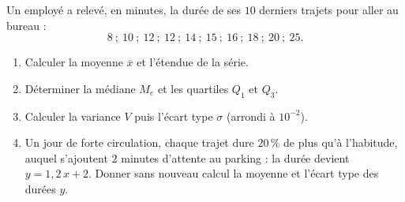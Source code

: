 
Un employé a relevé, en minutes, la durée de ses $10$ derniers trajets pour aller au bureau :
$$8\ ;\ 10\ ;\ 12\ ;\ 12\ ;\ 14\ ;\ 15\ ;\ 16\ ;\ 18\ ;\ 20\ ;\ 25.$$

\begin{enumerate}
  \item Calculer la moyenne $\overline{x}$ et l'étendue de la série.
  \item Déterminer la médiane $M_e$ et les quartiles $Q_1$ et $Q_3$.
  \item Calculer la variance $V$ puis l'écart type $\sigma$ (arrondi à $10^{-2}$).
  \item Un jour de forte circulation, chaque trajet dure $20\,\%$ de plus qu'à l'habitude, auquel s'ajoutent $2$ minutes d'attente au parking : la durée devient $y=1{,}2\,x+2$. Donner sans nouveau calcul la moyenne et l'écart type des durées $y$.
\end{enumerate}

